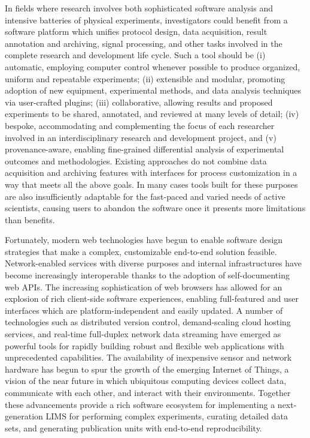 \documentclass[../thesis]{subfiles}
\begin{document}
In fields where research involves both sophisticated software analysis
and intensive batteries of physical experiments, investigators could
benefit from a software platform which unifies protocol design, data
acquisition, result annotation and archiving, signal processing, and
other tasks involved in the complete research and development life
cycle. Such a tool should be (i) automatic, employing computer control
whenever possible to produce organized, uniform and repeatable
experiments; (ii) extensible and modular, promoting adoption of new
equipment, experimental methods, and data analysis techniques via
user-crafted plugins; (iii) collaborative, allowing results and
proposed experiments to be shared, annotated, and reviewed at many
levels of detail; (iv) bespoke, accommodating and complementing the
focus of each researcher involved in an interdisciplinary research and
development project, and (v) provenance-aware, enabling fine-grained
differential analysis of experimental outcomes and
methodologies. Existing approaches do not combine data acquisition and
archiving features with interfaces for process customization in a way
that meets all the above goals. In many cases tools built for
these purposes are also insufficiently adaptable for the fast-paced
and varied needs of active scientists, causing users to abandon the
software once it presents more limitations than benefits.

Fortunately, modern web technologies have begun
to enable software design strategies that make a complex, customizable
end-to-end solution feasible. Network-enabled services with
diverse purposes and internal infrastructures have become increasingly
interoperable thanks to the adoption of self-documenting web \glspl{API}. The
increasing sophistication of web browsers has allowed for an
explosion of rich client-side software experiences, enabling
full-featured and user interfaces which are platform-independent and easily
updated. A number of technologies such as distributed version control,
demand-scaling cloud hosting services, and real-time full-duplex
network data streaming have emerged as powerful tools for
rapidly building robust and flexible web applications with
unprecedented capabilities. The
availability of inexpensive sensor and network hardware has begun to
spur the growth of the emerging Internet of Things, a vision of the
near future in which ubiquitous computing devices collect data,
communicate with each other, and interact with their environments.
Together these advancements provide a rich software ecosystem for
implementing a next-generation \gls{LIMS} for performing complex
experiments, curating detailed data sets, and generating publication
units with end-to-end reproducibility.
\end{document}
